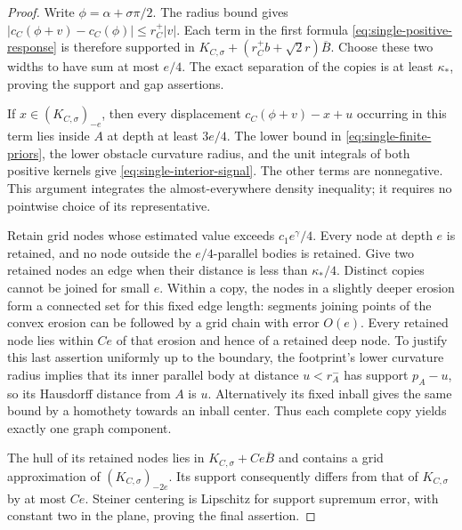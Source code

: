 \begin{proof}
Write $\phi=\alpha+\sigma\pi/2$.  The radius bound gives
$|c_C(\phi+v)-c_C(\phi)|\le r_C^+|v|$.  Each term in the first
formula \eqref{eq:single-positive-response} is therefore supported
in $K_{C,\sigma}+(r_C^+b+\sqrt2r)\overline B$.  Choose these two
widths to have sum at most $e/4$.  The exact separation of the copies
is at least $\kappa_*$, proving the support and gap assertions.

If $x\in(K_{C,\sigma})_{-e}$, then every displacement
$c_C(\phi+v)-x+u$ occurring in this term lies inside $A$ at depth
at least $3e/4$.  The lower bound in
\eqref{eq:single-finite-priors}, the lower obstacle curvature radius,
and the unit integrals of both positive kernels give
\eqref{eq:single-interior-signal}.  The other terms are nonnegative.
This argument integrates the almost-everywhere density inequality;
it requires no pointwise choice of its representative.

Retain grid nodes whose estimated value exceeds $c_1e^\gamma/4$.
Every node at depth $e$ is retained, and no node outside the
$e/4$-parallel bodies is retained.  Give two retained nodes an edge
when their distance is less than $\kappa_*/4$.  Distinct copies cannot
be joined for small $e$.  Within a copy, the nodes in a slightly deeper
erosion form a connected set for this fixed edge length: segments
joining points of the convex erosion can be followed by a grid chain
with error $O(e)$.  Every retained node lies within $Ce$ of that
erosion and hence of a retained deep node.  To justify this last
assertion uniformly up to the boundary, the footprint's lower
curvature radius implies that its inner parallel body at distance
$u<r_A^-$ has support $p_A-u$, so its Hausdorff distance from $A$
is $u$.  Alternatively its fixed inball gives the same bound by a
homothety towards an inball center.  Thus each complete copy yields
exactly one graph component.

The hull of its retained nodes lies in $K_{C,\sigma}+Ce\overline B$
and contains a grid approximation of $(K_{C,\sigma})_{-2e}$.
Its support consequently differs from that of $K_{C,\sigma}$ by
at most $Ce$.  Steiner centering is Lipschitz for support supremum
error, with constant two in the plane, proving the final assertion.
\end{proof}

